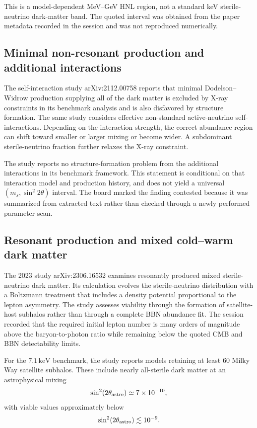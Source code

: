 \documentclass[11pt,a4paper]{article}
\begin{document}
This is a model-dependent MeV--GeV HNL region, not a standard keV sterile-neutrino dark-matter band. The quoted interval was obtained from the paper metadata recorded in the session and was not reproduced numerically.

\subsection{Minimal non-resonant production and additional interactions}

The self-interaction study arXiv:2112.00758 reports that minimal Dodelson--Widrow production supplying all of the dark matter is excluded by X-ray constraints in its benchmark analysis and is also disfavored by structure formation. The same study considers effective non-standard active-neutrino self-interactions. Depending on the interaction strength, the correct-abundance region can shift toward smaller or larger mixing or become wider. A subdominant sterile-neutrino fraction further relaxes the X-ray constraint.

The study reports no structure-formation problem from the additional interactions in its benchmark framework. This statement is conditional on that interaction model and production history, and does not yield a universal \((m_s,\sin^2 2\theta)\) interval. The board marked the finding contested because it was summarized from extracted text rather than checked through a newly performed parameter scan.

\subsection{Resonant production and mixed cold--warm dark matter}

The 2023 study arXiv:2306.16532 examines resonantly produced mixed sterile-neutrino dark matter. Its calculation evolves the sterile-neutrino distribution with a Boltzmann treatment that includes a density potential proportional to the lepton asymmetry. The study assesses viability through the formation of satellite-host subhalos rather than through a complete BBN abundance fit. The session recorded that the required initial lepton number is many orders of magnitude above the baryon-to-photon ratio while remaining below the quoted CMB and BBN detectability limits.

For the \(7.1\,\mathrm{keV}\) benchmark, the study reports models retaining at least 60 Milky Way satellite subhalos. These include nearly all-sterile dark matter at an astrophysical mixing
\[
\sin^2(2\theta_{\rm astro})\simeq 7\times10^{-10},
\]
with viable values approximately below
\[
\sin^2(2\theta_{\rm astro})\lesssim10^{-9}.
\]
\end{document}
